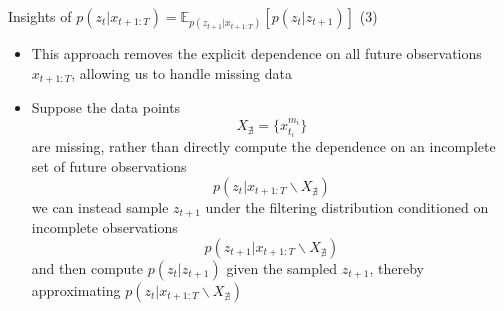 \documentclass{beamer}
\begin{document}
\begin{frame}{Insights of $p(z_t|x_{t+1:T})=\mathbb{E}_{p(z_{t+1}|x_{t+1:T})}[p(z_t|z_{t+1})]$ (3)}
\begin{itemize}
\item This approach removes the explicit dependence on all future observations $x_{t+1:T}$, allowing us to handle missing data
\item Suppose the data points\[
X_{\nexists}=\{x_{t_i}^{m_i}\}
\]are missing, rather than directly compute the dependence on an incomplete set of future observations\[
p(z_t|x_{t+1:T}\backslash X_{\nexists})
\]we can instead sample $z_{t+1}$ under the filtering distribution conditioned on incomplete observations\[
p(z_{t+1}|x_{t+1:T}\backslash X_{\nexists})
\]and then compute $p(z_t|z_{t+1})$ given the sampled $z_{t+1}$, thereby approximating $p(z_t|x_{t+1:T}\backslash X_{\nexists})$
\end{itemize}
\end{frame}
\end{document}
